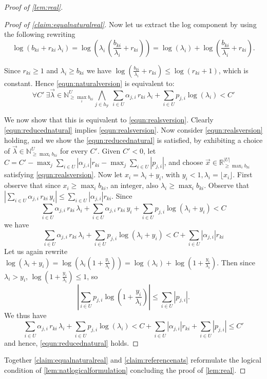 \documentclass[10pt,a4paper]{amsart}
\numberwithin{equation}{section}
\theoremstyle{plain}
\theoremstyle{definition}
\theoremstyle{remark}
\newenvironment{subproof}[1][\proofname]{\renewcommand{\qedsymbol}{{$\blacksquare$}}\begin{proof}[#1]}{\end{proof}}
\newcommand\pbra[1]{\left( #1 \right)}
\newcommand\abs[1]{\left\vert #1 \right\vert}
\newcommand\revar{x}
\newcommand\revec{\vec{x}}
\newcommand\intvar{\lambda}
\newcommand\basevecraw{b}
\newcommand\pvecraw{r}
\begin{document}
\begin{proof}[Proof of \cref{lem:real}]
\begin{subproof}[Proof of \cref{claim:equalnaturalreal}]
Now let us extract the log component by using the following rewriting \[\log(\basevecraw_{ki} + \pvecraw_{ki}\, \lambda_i) = 
\log\pbra{\lambda_i\,\pbra{\frac{\basevecraw_{ki}}{\lambda_i} + \pvecraw_{ki}}} = 
\log(\lambda_i) + \log\pbra{\frac{\basevecraw_{ki}}{\lambda_i} + \pvecraw_{ki}}.\]

Since $\pvecraw_{ki} \ge 1$ and $\lambda_i \ge \basevecraw_{ki}$ we have $\log\pbra{\frac{\basevecraw_{ki}}{\lambda_i} + \pvecraw_{ki}}  \le \log(\pvecraw_{ki} + 1)$, which is constant. Hence \cref{equn:naturalversion} is equivalent to:
\begin{equation}\label{equn:reducednatural}
\forall C'\  \exists \vec{\lambda} \in \mathbb{N}^{U}_{\ge \max_i{\basevecraw_{ki}}}
\bigwedge_{j \in h_\mathcal{Y}}\ \sum_{i \in U} \alpha_{j,i}\, \pvecraw_{ki}\, \lambda_i + \sum_{i \in U}  p_{j,i}\log(\lambda_i) < C'
\end{equation}

We now show that this is equivalent to \cref{equn:realsversion}. Clearly  \cref{equn:reducednatural} implies \cref{equn:realsversion}. Now consider  \cref{equn:realsversion} holding, and we show the \cref{equn:reducednatural} is satisfied, by exhibiting a choice of $ \vec{\lambda} \in \mathbb{N}^{U}_{\ge \max_i{\basevecraw_{ki}}}$ for every $C'$.
%
Given $C' < 0 $, let $C = C' - \max_j\sum_{i \in U} |\alpha_{j,i}|\pvecraw_{ki} - \max_j\sum_{i \in U} |p_{j,i}|$, and choose $\revec \in \mathbb{R}^{|U|}_{\ge \max_i{\basevecraw_{ki}}}$ satisfying \cref{equn:realsversion}.
%
Now let $\revar_i = \intvar_i + y_i$, with $y_i  <  1, \intvar_i = \lfloor \revar_i \rfloor$. First observe that since $\revar_i \ge \max_i \basevecraw_{ki}$, an integer, also $\intvar_i \ge \max_i \basevecraw_{ki}$.
%
Observe that ${\abs{\sum_{i \in U} \alpha_{j,i}\, \pvecraw_{ki}\,  y_i } }  \le \sum_{i \in U} |\alpha_{j,i}|\pvecraw_{ki}$. Since
\[ \sum_{i \in U} \alpha_{j,i}\, \pvecraw_{ki}\, \intvar_i + {\sum_{i \in U} \alpha_{j,i}\, \pvecraw_{ki}\,  y_i} + \sum_{i \in U}  p_{j,i}\log(\intvar_i + y_i) < C
\]
we have
\[ \sum_{i \in U} \alpha_{j,i}\, \pvecraw_{ki}\, \intvar_i  + \sum_{i \in U}  p_{j,i}\log(\intvar_i + y_i) < C  + \sum_{i \in U} |\alpha_{j,i}|\pvecraw_{ki}
\]
Let us again rewrite $\log(\intvar_i + y_i) = \log\pbra{\intvar_i\pbra{1 + \frac{y_i}{\intvar_i}}}= \log(\intvar_i) + \log\pbra{1 + \frac{y_i}{\intvar_i}}$. Then since $\intvar_i > y_i$, $\log\pbra{1 + \frac{y_i}{\intvar_i}} \le 1$, so \[{\abs{\sum_{i \in U}  p_{j,i}\log\pbra{1 + \frac{y_i}{\intvar_i}} }} \le \sum_{i \in U}  |p_{j,i}|.\] 
We thus have
\[ \sum_{i \in U} \alpha_{j,i}\, \pvecraw_{ki}\, \intvar_i  + \sum_{i \in U}  p_{j,i}\log(\intvar_i)< C  + \sum_{i \in U} |\alpha_{j,i}|\pvecraw_{ki} + \sum_{i \in U} |p_{j,i}| \le C'
\]
and hence, \cref{equn:reducednatural} holds.\end{subproof}

Together \cref{claim:equalnaturalreal} and \cref{claim:referencenats} reformulate the logical condition of \cref{lem:natlogicalformulation} concluding the proof of \cref{lem:real}.
\end{proof}
\end{document}
